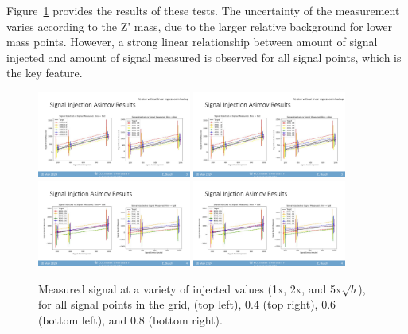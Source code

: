 
Figure~\ref{fig:siginj_asimov} provides the results of these tests. 
The uncertainty of the measurement varies according to the Z' mass, due to the larger relative background for lower mass points. 
However, a strong linear relationship between amount of signal injected and amount of signal measured is observed for all signal points, which is the key feature.
\begin{figure}[!htbp]
\centering
   \includegraphics[width=0.45\textwidth]{figures/stats/siginj_asimov_02}
   \includegraphics[width=0.45\textwidth]{figures/stats/siginj_asimov_04}
   \includegraphics[width=0.45\textwidth]{figures/stats/siginj_asimov_06}
   \includegraphics[width=0.45\textwidth]{figures/stats/siginj_asimov_08}
   \caption{Measured signal at a variety of injected values (1x, 2x, and 5x$\sqrt{b}$), for all signal points in the grid,  (top left), 0.4 (top right), 0.6 (bottom left), and 0.8 (bottom right).
    \label{fig:siginj_asimov}}
\end{figure}

